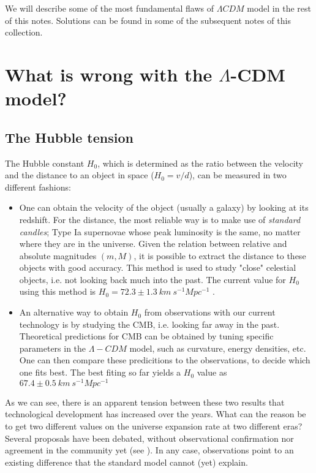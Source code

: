 \documentclass[11pt, a4paper]{article} %
\begin{document}
We will describe some of the most fundamental flaws of $\Lambda CDM$ model in the rest of this notes. Solutions can be found in some of the subsequent notes of this collection.

\section*{What is wrong with the $\Lambda$-CDM model?}


\subsection*{The Hubble tension}

The Hubble constant $H_{0}$, which is determined as the ratio between the velocity and the distance to an object in space ($H_{0} = v/d$), can be measured in two different fashions:

\begin{itemize}
	\item One can obtain the velocity of the object (usually a galaxy) by looking at its redshift. For the distance, the most reliable way is to make use of \textit{standard candles}; Type Ia supernovae whose peak luminosity is the same, no matter where they are in the universe. Given the relation between relative and absolute magnitudes $(m, M)$, it is possible to extract the distance to these objects with good accuracy. This method is used to study "close" celestial objects, i.e. not looking back much into the past. The current value for $H_{0}$ using this method is $H_{0} = 72.3 \pm 1.3 \: km \:s^{-1} Mpc^{-1}$ \cite{2020planck}.
	
	\item An alternative way to obtain $H_{0}$ from observations with our current technology is by studying the CMB, i.e. looking far away in the past. Theoretical predictions for CMB can be obtained by tuning specific parameters in the $\Lambda- CDM$ model, such as curvature, energy densities, etc. One can then compare these predicitions to the observations, to decide which one fits best. The best fiting so far yields a $H_{0}$ value as $67.4 \pm 0.5 \: km \:s^{-1} Mpc^{-1}$ \cite{Riess_2021}
\end{itemize}

As we can see, there is an apparent tension between these two results that technological development has increased over the years. What can the reason be to get two different values on the universe expansion rate at two different eras? Several proposals have been debated, without observational confirmation nor agreement in the community yet (see \cite{di2021realm}). In any case, observations point to an existing difference that the standard model cannot (yet) explain.
\end{document}
